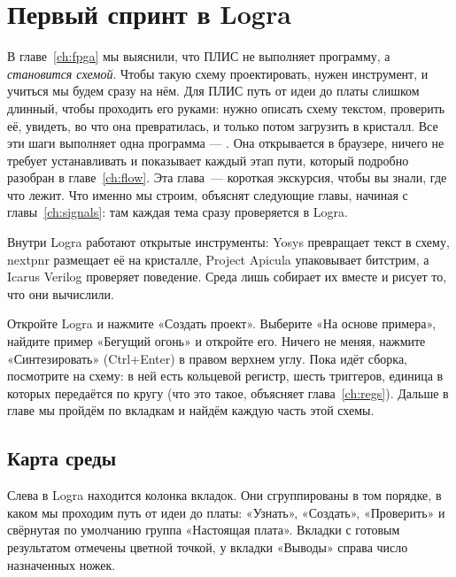 \chapter{Первый спринт в Logra}
\label{ch:logra}

В главе~\ref{ch:fpga} мы выяснили, что ПЛИС не выполняет программу, а
\emph{становится схемой}. Чтобы такую схему проектировать, нужен инструмент, и
учиться мы будем сразу на нём. Для ПЛИС путь от идеи до платы слишком длинный,
чтобы проходить его руками: нужно описать схему текстом, проверить её, увидеть,
во что она превратилась, и только потом загрузить в кристалл. Все эти шаги
выполняет одна программа --- . Она открывается в браузере, ничего
не требует устанавливать и показывает каждый этап пути, который подробно
разобран в главе~\ref{ch:flow}. Эта глава~--- короткая экскурсия, чтобы вы
знали, где что лежит. Что именно мы строим, объяснят следующие главы, начиная с
главы~\ref{ch:signals}: там каждая тема сразу проверяется в Logra.

Внутри Logra работают открытые инструменты: Yosys превращает текст в схему,
nextpnr размещает её на кристалле, Project Apicula упаковывает битстрим, а
Icarus Verilog проверяет поведение. Среда лишь собирает их вместе и рисует то,
что они вычислили.

\begin{buildbox}
Откройте Logra и нажмите «Создать проект». Выберите «На основе примера»,
найдите пример «Бегущий огонь» и откройте его. Ничего не меняя, нажмите
«Синтезировать» (Ctrl+Enter) в правом верхнем углу. Пока идёт сборка, посмотрите
на схему: в ней есть кольцевой регистр, шесть триггеров, единица в которых
передаётся по кругу (что это такое, объясняет глава~\ref{ch:regs}). Дальше в
главе мы пройдём по вкладкам и найдём каждую часть этой схемы.
\end{buildbox}

\section{Карта среды}

Слева в Logra находится колонка вкладок. Они сгруппированы в том порядке, в
каком мы проходим путь от идеи до платы: «Узнать», «Создать», «Проверить» и
свёрнутая по умолчанию группа «Настоящая плата». Вкладки с готовым результатом
отмечены цветной точкой, у вкладки «Выводы» справа число назначенных ножек.

